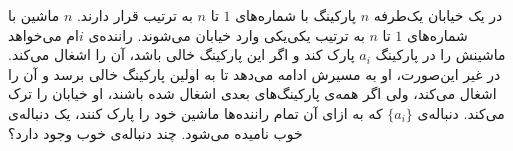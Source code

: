\EXERCISE
در یک خیابان یک‌طرفه
$n$
پارکینگ با شماره‌های
$1$
تا
$n$
به ترتیب قرار دارند.
$n$
ماشین با شماره‌های
$1$
تا
$n$
به ترتیب یکی‌یکی وارد خیابان می‌شوند. راننده‌ی $i$ام می‌خواهد ماشینش را در پارکینگ
$a_i$
پارک کند و اگر این پارکینگ خالی باشد، آن را اشغال می‌کند. در غیر این‌صورت، او به مسیرش ادامه می‌دهد تا به اولین پارکینگ خالی برسد و آن را اشغال می‌کند، ولی اگر همه‌ی پارکینگ‌های بعدی اشغال شده باشند، او خیابان را ترک می‌کند. دنباله‌ی
$\{a_i\}$
که به ازای آن تمام راننده‌ها ماشین خود را پارک کنند، یک دنباله‌ی خوب نامیده می‌شود. چند دنباله‌ی خوب وجود دارد؟